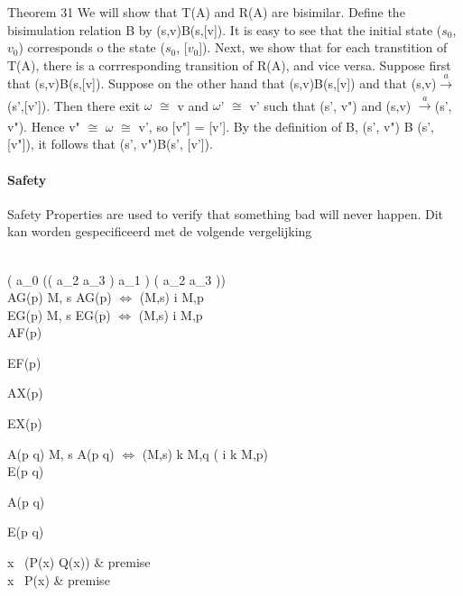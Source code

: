 Theorem 31
We will show that T(A) and R(A) are bisimilar. Define the bisimulation relation B by (s,v)B(s,[v]). It is easy to see that the initial state ($s_0$, $v_0$) corresponds o the  state ($s_0$, [$v_0$]). Next, we show that for each transtition of T(A), there is a corrresponding transition  of R(A), and vice versa. Suppose first that (s,v)B(s,[v]). Suppose on the other hand that (s,v)B(s,[v]) and that  (s,v)$\xrightarrow[]{a}$(s',[v']). Then there exit $\omega$ $\cong$ v and $\omega$' $\cong$ v' such that (s', v") and (s,v) $\xrightarrow[]{a}$(s', v"). Hence v" $\cong$ $\omega$ $\cong$ v', so [v"] = [v']. By the definition of B, (s', v")
B (s', [v"]), it follows that (s', v")B(s', [v']).


\paragraph{Safety}
Safety Properties are used to verify that something
bad will never happen. Dit kan worden gespecificeerd met de volgende vergelijking

\aqcap\\

\square ( a_0 \implies (( \lnot a_2 \wedge \lnot a_3 )  a_1 ) \vee ( \lnot a_2 \wedge \lnot a_3 )) \\

AG(p)
M, s \models AG(p) $\Leftrightarrow$     \forall \pi \in  \sqcap (M,s) \cdot \forall i \cdot M,\pi[i] \models p\\

EG(p)
M, s \models EG(p) $\Leftrightarrow$     \exists \pi \in  \sqcap (M,s) \cdot \forall i \cdot M,\pi[i] \models p\\

AF(p)

EF(p)

AX(p)

EX(p)

A(p \cup q)
M, s \models  A(p \cup q)   $\Leftrightarrow$     \forall \pi \in  \sqcap (M,s) \cdot \exists k \cdot M,\pi[k] \models q \wedge ( \forall i \leq k \cdot M,\pi [i] \models p)\\
E(p \cup q)

A(p \Re q)

E(p \Re q)

\forall x \, (P(x) \to Q(x)) & premise \\
\forall x \, P(x) & premise \\\hspace*{-30pt} \\


